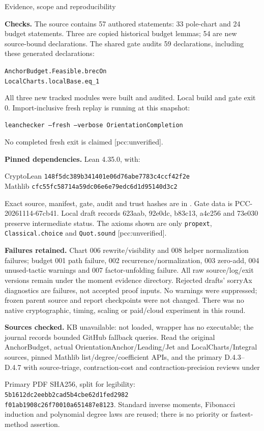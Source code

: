\documentclass[10pt]{article}
\begin{document}
\newpage
\begin{center}{\Large Evidence, scope and reproducibility}\end{center}
\textbf{Checks.} The source contains 57 authored statements: 33 pole-chart
and 24 budget statements. Three are copied historical budget lemmas; 54 are
new source-bound declarations. The shared gate audits 59 declarations,
including these generated declarations:
\begin{center}\texttt{AnchorBudget.Feasible.brecOn}\\
\texttt{LocalCharts.localBase.eq\_1}\end{center}
All three new tracked modules were built and audited. Local build and gate
exit 0. Import-inclusive fresh replay is running at this snapshot:
\begin{center}\texttt{leanchecker --fresh --verbose OrientationCompletion}\end{center}
No completed fresh exit is claimed [pcc:unverified].

\textbf{Pinned dependencies.} Lean 4.35.0, with:
\begin{center}\small
CryptoLean \texttt{148f5dc389b341401e06d76abe7783c4ccf42f2e}\\
Mathlib \texttt{cfc55fc58714a59dc06e6e79edc6d1d95140d3c2}
\end{center}
Exact source, manifest, gate, audit and trust hashes are in
. Gate data is PCC-20261114-67cb41.
Local draft records 623aab, 92e0dc, b83c13, a4c256 and 73e030 preserve
intermediate status. The axioms shown are only \texttt{propext},
\texttt{Classical.choice} and \texttt{Quot.sound} [pcc:unverified].

\textbf{Failures retained.} Chart 006 rewrite/visibility and 008 helper
normalization failures; budget 001 path failure, 002 recurrence/normalization,
003 zero-add, 004 unused-tactic warnings and 007 factor-unfolding failure.
All raw source/log/exit versions remain under the moment evidence directory.
Rejected drafts' sorryAx diagnostics are failures, not accepted proof inputs.
No warnings were suppressed; frozen parent source and report checkpoints
were not changed. There was no native cryptographic, timing, scaling or
paid/cloud experiment in this round.

\textbf{Sources checked.} KB unavailable: not loaded, wrapper has no
executable; the journal records bounded GitHub fallback queries. Read the
original AnchorBudget, actual OrientationAnchor/Leading/Jet and
LocalCharts/Integral sources, pinned Mathlib list/degree/coefficient APIs,
and the primary D.4.3--D.4.7 with source-triage, contraction-cost and
contraction-precision reviews under
\begin{center}\small{}\end{center}
Primary PDF SHA256, split for legibility:
\texttt{5b1612dc2eebb2cad5b4cbe62d1fed2982}\\
\texttt{f01ab1908c26f70010a651487e8123}.
Standard inverse moments, Fibonacci induction and polynomial degree laws
are reused; there is no priority or fastest-method assertion.
\end{document}
